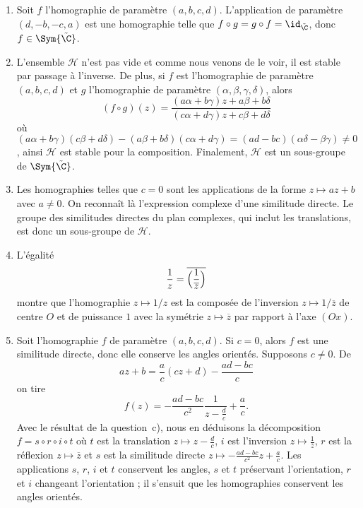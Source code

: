 
\begin{enumerate}
  \item %
    Soit $f$ l'homographie de paramètre $(a, b, c, d)$.
    L'application de paramètre $(d, -b, -c, a)$ est une homographie telle que $f\circ g = g\circ f = \id_{\tilde{\C}}$, donc $f\in \Sym{\tilde{\C}}$.

  \item %
    L'ensemble $\mathcal{H}$ n'est pas vide et comme nous venons de le voir, il est stable par passage à l'inverse.
    De plus, si $f$ est l'homographie de paramètre $(a, b, c, d)$ et $g$ l'homographie de paramètre $(\alpha, \beta, \gamma, \delta)$, alors
    \[
      (f\circ g)(z) = \frac{(a\alpha + b\gamma) z + a\beta + b\delta}{(c\alpha + d\gamma)z + c\beta + d\delta}
    \]
    où $(a\alpha + b\gamma)(c\beta + d\delta) - (a\beta + b\delta)(c\alpha + d\gamma) = (ad - bc)(\alpha\delta - \beta\gamma) \neq 0$, ainsi  $\mathcal{H}$ est stable pour la composition.
    Finalement, $\mathcal{H}$ est un sous-groupe de $\Sym{\tilde{\C}}$.

  \item %
    Les homographies telles que $c = 0$ sont les applications de la forme $z\mapsto az + b$ avec $a\neq 0$.
    On reconnaît là l'expression complexe d'une similitude directe.
    Le groupe des similitudes directes du plan complexes, qui inclut les translations,  est donc un sous-groupe de $\mathcal{H}$.

  \item %
    L'égalité
    \[
      \frac{1}{z} = \overline{\Bigl(\frac{1}{\overline{z}}\Bigr)}
    \]
    montre que l'homographie $z\mapsto 1/z$ est la composée de l'inversion $z\mapsto 1/\overline{z}$ de centre $O$ et de puissance $1$ avec la symétrie $z\mapsto\overline{z}$ par rapport à l'axe $(Ox)$.

  \item %
    Soit l'homographie $f$ de paramètre $(a, b, c, d)$.
    Si $c = 0$, alors $f$ est une similitude directe, donc elle conserve les angles orientés.
    Supposons $c\neq 0$.
    De
    \[
      az + b = \frac{a}{c}(cz + d) - \frac{ad - bc}{c}
    \]
    on tire
    \[
      f(z) = -\frac{ad - bc}{c^2}\frac{1}{z - \frac{d}{c}} + \frac{a}{c}.
    \]
    Avec le résultat de la question~c), nous en déduisons la décomposition $f = s\circ r\circ i\circ t$ où $t$ est la translation $z\mapsto z - \frac{d}{c}$, $i$ est l'inversion $z\mapsto \frac{1}{\overline{z}}$, $r$ est la réflexion $z\mapsto\overline{z}$ et $s$ est la similitude directe $z\mapsto -\frac{ad - bc}{c^2} z + \frac{a}{c}$.
    Les applications $s$, $r$, $i$ et $t$ conservent les angles, $s$ et $t$ préservant l'orientation, $r$ et $i$ changeant l'orientation ; il s'ensuit que les homographies conservent les angles orientés.


\end{enumerate}

